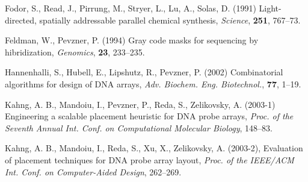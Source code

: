 \documentclass{bioinfo}
\begin{document}
\begin{thebibliography}{}

 Fodor, S., Read, J., Pirrung, M., Stryer, L., Lu, A., Solas, D. (1991) Light-directed, spatially addressable parallel chemical synthesis, {\it Science}, {\bf 251}, 767--73.

 Feldman, W., Pevzner, P. (1994) Gray code masks for sequencing by hibridization, {\it Genomics}, {\bf 23}, 233--235.

 Hannenhalli, S., Hubell, E., Lipshutz, R., Pevzner, P. (2002) Combinatorial algorithms for design of DNA arrays, {\it Adv. Biochem. Eng. Biotechnol.}, {\bf 77}, 1--19.

 Kahng, A. B., Mandoiu, I., Pevzner, P., Reda, S., Zelikovsky, A. (2003-1) Engineering a scalable placement heuristic for DNA probe arrays, {\it Proc. of the Seventh Annual Int. Conf. on Computational Molecular Biology}, 148--83.

 Kahng, A. B., Mandoiu, I., Reda, S., Xu, X., Zelikovsky, A. (2003-2), Evaluation of placement techniques for DNA probe array layout, {\it Proc. of the IEEE/ACM Int. Conf. on Computer-Aided Design}, 262--269.

\end{thebibliography}
\end{document}
